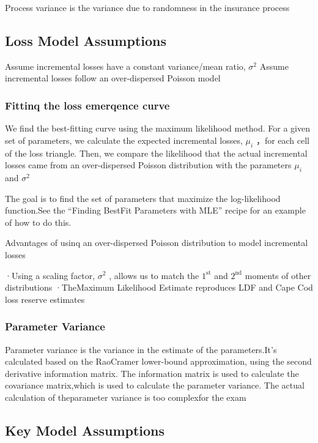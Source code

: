 \documentclass[
]{article}
\begin{document}
Process variance is the variance due to randomness in the insurance
process

\subsection{Loss Model Assumptions}\label{loss-model-assumptions}

Assume incremental losses have a constant variance/mean ratio,
\(\sigma^{2}\) Assume incremental losses follow an over-dispersed
Poisson model

\subsubsection{Fittinq the loss emerqence
curve}\label{fittinq-the-loss-emerqence-curve}

We find the best-fitting curve using the maximum likelihood method. For
a given set of parameters, we calculate the expected incremental losses,
\(\mu_{i}\) ，for each cell of the loss triangle. Then, we compare the
likelihood that the actual incremental losses came from an
over-dispersed Poisson distribution with the parameters \(\mu_{i}\) and
\(\sigma^{2}\)

The goal is to find the set of parameters that maximize the
log-likelihood function.See the ``Finding BestFit Parameters with MLE''
recipe for an example of how to do this.

Advantages of usinq an over-dispersed Poisson distribution to model
incremental losses

·Using a scaling factor, \(\sigma^{2}\) , allows us to match the
\(1^{\mathrm{st}}\) and \(2^{\mathrm{nd}}\) moments of other
distributions ·TheMaximum Likelihood Estimate reproduces LDF and Cape
Cod loss reserve estimates

\subsubsection{Parameter Variance}\label{parameter-variance}

Parameter variance is the variance in the estimate of the
parameters.It's calculated based on the RaoCramer lower-bound
approximation, using the second derivative information matrix. The
information matrix is used to calculate the covariance matrix,which is
used to calculate the parameter variance. The actual calculation of
theparameter variance is too complexfor the exam

\subsection{Key Model Assumptions}\label{key-model-assumptions}
\end{document}
